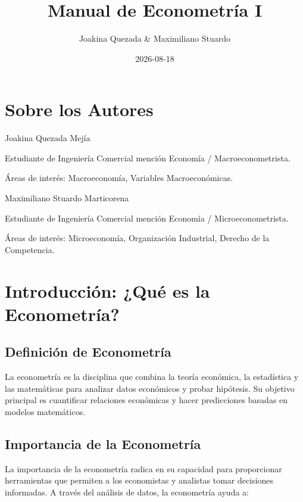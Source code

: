 \documentclass[
]{book}
\title{Manual de Econometría I}
\author{Joakina Quezada \& Maximiliano Stuardo}
\date{2026-08-18}
\begin{document}
\maketitle

{
\setcounter{tocdepth}{1}
\tableofcontents
}
\chapter*{Sobre los Autores}\label{sobre-los-autores}

Joakina Quezada Mejía

Estudiante de Ingeniería Comercial mención Economía / Macroeconometrista.

Áreas de interés: Macroeconomía, Variables Macroeconómicas.

Maximiliano Stuardo Marticorena

Estudiante de Ingeniería Comercial mención Economía / Microeconometrista.

Áreas de interés: Microeconomía, Organización Industrial, Derecho de la Competencia.

\chapter*{Introducción: ¿Qué es la Econometría?}\label{introducciuxf3n-quuxe9-es-la-econometruxeda}

\section*{Definición de Econometría}\label{definiciuxf3n-de-econometruxeda}

La econometría es la disciplina que combina la teoría económica, la estadística y las matemáticas para analizar datos económicos y probar hipótesis. Su objetivo principal es cuantificar relaciones económicas y hacer predicciones basadas en modelos matemáticos.

\section*{Importancia de la Econometría}\label{importancia-de-la-econometruxeda}

La importancia de la econometría radica en su capacidad para proporcionar herramientas que permiten a los economistas y analistas tomar decisiones informadas. A través del análisis de datos, la econometría ayuda a:
\end{document}
